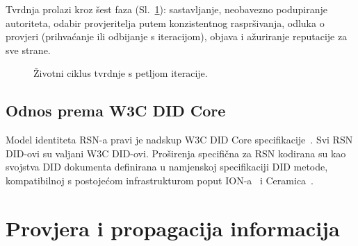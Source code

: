 \documentclass[11pt,a4paper,twocolumn]{article}
\begin{document}
Tvrdnja prolazi kroz šest faza (Sl.~\ref{fig:lifecycle}): sastavljanje, neobavezno podupiranje autoriteta, odabir provjeritelja putem konzistentnog raspršivanja, odluka o provjeri (prihvaćanje ili odbijanje s iteracijom), objava i ažuriranje reputacije za sve strane.

\begin{figure}[ht]
\centering
{}
\caption{Životni ciklus tvrdnje s petljom iteracije.}
\label{fig:lifecycle}
\end{figure}

\subsection{Odnos prema W3C DID Core}

Model identiteta RSN-a pravi je nadskup W3C DID Core specifikacije~\cite{did2022}. Svi RSN DID-ovi su valjani W3C DID-ovi. Proširenja specifična za RSN kodirana su kao svojstva DID dokumenta definirana u namjenskoj specifikaciji DID metode, kompatibilnoj s postojećom infrastrukturom poput ION-a~\cite{buchner2021} i Ceramica~\cite{ceramic2023}.

\section{Provjera i propagacija informacija}
\end{document}
